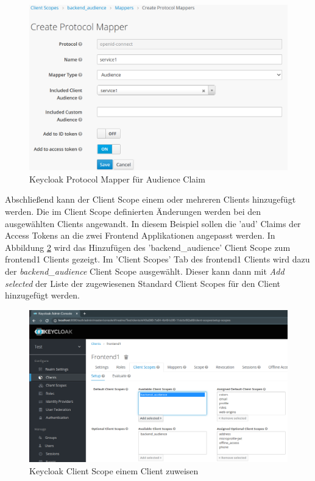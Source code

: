 \begin{figure}[!h]
	\centering
	\includegraphics[width=1\textwidth]{Images/Ebert/KeycloakNewAudProtocolMapper.PNG}
	\caption{Keycloak Protocol Mapper für Audience Claim}
	\label{fig:EB_Keycloak Protocol Mapper für Audience Claim}
\end{figure}

Abschließend kann der Client Scope einem oder mehreren Clients hinzugefügt werden. Die im Client Scope definierten Änderungen werden bei den ausgewählten Clients angewandt. In diesem Beispiel sollen die 'aud' Claims der Access Tokens an die zwei Frontend Applikationen angepasst werden. In Abbildung \ref{fig:EB_Keycloak Client Scope einem Client zuweisen} wird das Hinzufügen des 'backend\_audience' Client Scope zum frontend1 Clients gezeigt. Im 'Client Scopes' Tab des frontend1 Clients wird dazu der \textit{backend\_audience} Client Scope ausgewählt. Dieser kann dann mit \textit{Add selected} der Liste der zugewiesenen Standard Client Scopes für den Client hinzugefügt werden.

\begin{figure}[!h]
	\centering
	\includegraphics[width=1\textwidth]{Images/Ebert/KeycloakAddAudClientScope.PNG}
	\caption{Keycloak Client Scope einem Client zuweisen}
	\label{fig:EB_Keycloak Client Scope einem Client zuweisen}
\end{figure}

